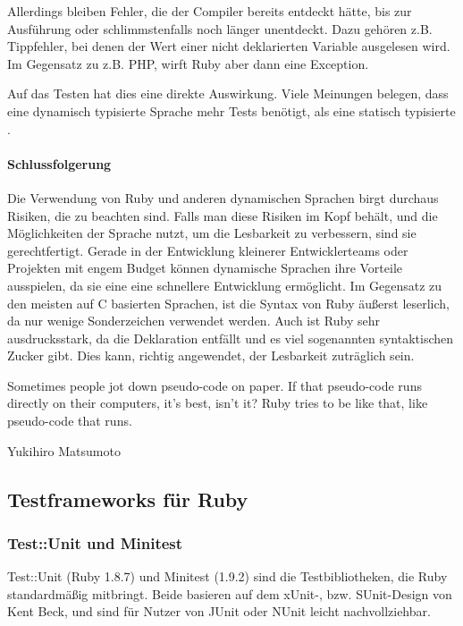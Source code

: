 Allerdings bleiben Fehler, die der Compiler bereits entdeckt hätte, bis zur Ausführung oder schlimmstenfalls noch länger unentdeckt. Dazu gehören z.B. Tippfehler, bei denen der Wert einer nicht deklarierten Variable ausgelesen wird. Im Gegensatz zu z.B. PHP, wirft Ruby aber dann eine Exception.

Auf das Testen hat dies eine direkte Auswirkung. Viele Meinungen belegen, dass eine dynamisch typisierte Sprache mehr Tests benötigt, als eine statisch typisierte \citep{daniel_spiewak_dynamic_2010}. 

% 
% 
% 

\paragraph{Schlussfolgerung}

Die Verwendung von Ruby und anderen dynamischen Sprachen birgt durchaus Risiken, die zu beachten sind. Falls man diese Risiken im Kopf behält, und die Möglichkeiten der Sprache nutzt, um die Lesbarkeit zu verbessern, sind sie gerechtfertigt. Gerade in der Entwicklung kleinerer Entwicklerteams oder Projekten mit engem Budget können dynamische Sprachen ihre Vorteile ausspielen, da sie eine eine schnellere Entwicklung ermöglicht. Im Gegensatz zu den meisten auf C basierten Sprachen, ist die Syntax von Ruby äußerst leserlich, da nur wenige Sonderzeichen verwendet werden. Auch ist Ruby sehr ausdrucksstark, da die Deklaration entfällt und es viel sogenannten syntaktischen Zucker gibt. Dies kann, richtig angewendet, der Lesbarkeit zuträglich sein.

\epigraph{Sometimes people jot down pseudo-code on paper. If that pseudo-code runs directly on their computers, it's best, isn't it? Ruby tries to be like that, like pseudo-code that runs. }{Yukihiro Matsumoto}


\subsection{Testframeworks für Ruby}
\subsubsection{Test::Unit und Minitest}
Test::Unit (Ruby 1.8.7) und Minitest (1.9.2) sind die Testbibliotheken, die Ruby standardmäßig mitbringt. Beide basieren auf dem xUnit-, bzw. SUnit-Design von Kent Beck, und sind für Nutzer von JUnit oder NUnit leicht nachvollziehbar. 

